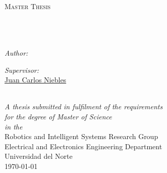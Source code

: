 \begin{titlepage}
\begin{center}

\textsc{\LARGE \university}\\[1.5cm] %
\textsc{\Large Master Thesis}\\[0.5cm] %

\HRule \\[0.4cm] %
{\huge \bfseries \ttitle}\\[0.4cm] %
\HRule \\[1.5cm] %
 
\begin{minipage}{0.4\textwidth}
\begin{flushleft} \large
\emph{Author:}\\
\authornames %
\end{flushleft}
\end{minipage}
\begin{minipage}{0.4\textwidth}
\begin{flushright} \large
\emph{Supervisor:} \\
\href{http://niebles.net}{Juan Carlos Niebles} %
\end{flushright}
\end{minipage}\\[3cm]
 
\large \textit{A thesis submitted in fulfilment of the requirements\\
for the degree of Master of Science}\\[0.3cm] %

\textit{in the}\\[0.4cm]
Robotics and Intelligent Systems Research Group\\Electrical and Electronics
Engineering Department\\Universidad del Norte\\[4cm] %

{\large \today}\\[2cm] %
 
\vfill
\end{center}

\end{titlepage}